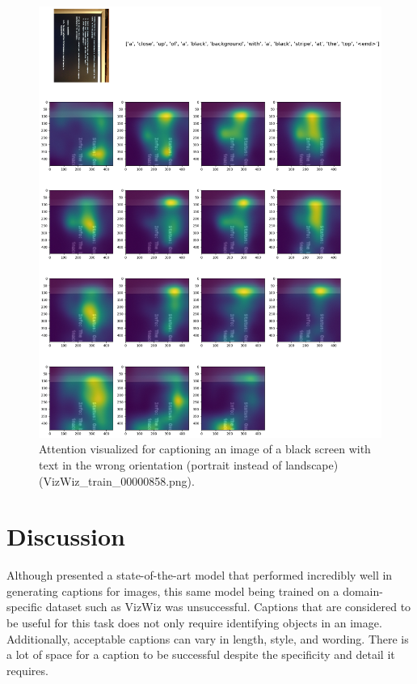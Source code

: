 \documentclass[11pt,a4paper]{article}
\begin{document}
\begin{figure}[ht]
  \includegraphics[width=\linewidth]{VizWiz_train_00000858.png}
  \caption{Attention visualized for captioning an image of a black screen with text in the wrong orientation (portrait instead of landscape)(VizWiz\_train\_00000858.png).}
  \label{fig:blackscreen}
\end{figure}

\section{Discussion}
\label{sec:discussion}
Although \citet{Xu-2015-show-attend} presented a state-of-the-art model that performed incredibly well in generating captions for images, this same model being trained on a domain-specific dataset such as VizWiz was unsuccessful. Captions that are considered to be useful for this task does not only require identifying objects in an image. Additionally, acceptable captions can vary in length, style, and wording. There is a lot of space for a caption to be successful despite the specificity and detail it requires. 
\end{document}
